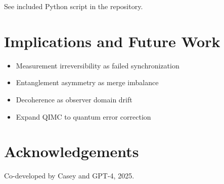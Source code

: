 \documentclass[11pt]{article}
\begin{document}
See included Python script in the repository.

\section{Implications and Future Work}
\begin{itemize}
  \item Measurement irreversibility as failed synchronization
  \item Entanglement asymmetry as merge imbalance
  \item Decoherence as observer domain drift
  \item Expand QIMC to quantum error correction
\end{itemize}

\section{Acknowledgements}
Co-developed by Casey and GPT-4, 2025.
\end{document}
